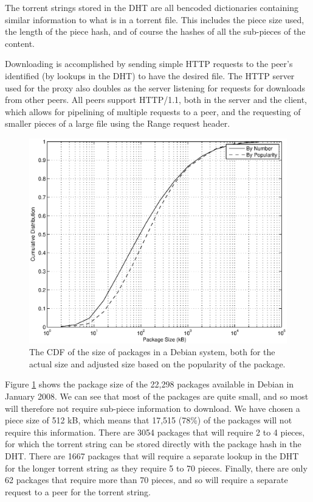 \documentclass[conference]{IEEEtran}
\begin{document}
The torrent strings stored in the DHT are all bencoded dictionaries
containing similar information to what is in a torrent file. This
includes the piece size used, the length of the piece hash, and of
course the hashes of all the sub-pieces of the content.

Downloading is accomplished by sending simple HTTP requests to the
peer's identified (by lookups in the DHT) to have the desired file.
The HTTP server used for the proxy also doubles as the server
listening for requests for downloads from other peers. All peers
support HTTP/1.1, both in the server and the client, which allows
for pipelining of multiple requests to a peer, and the requesting of
smaller pieces of a large file using the Range request header.

\begin{figure}
\centering
\includegraphics[width=\columnwidth]{apt_dht_simulation-size_CDF.eps}
\caption{The CDF of the size of packages in a Debian system, both
for the actual size and adjusted size based on the popularity of
the package.}
\label{size_CDF}
\end{figure}

Figure \ref{size_CDF} shows the package size of the 22,298 packages
available in Debian in January 2008. We can see that most of the
packages are quite small, and so most will therefore not require
sub-piece information to download. We have chosen a piece
size of 512 kB, which means that 17,515 (78\%) of the packages will
not require this information. There are 3054 packages that will
require 2 to 4 pieces, for which the torrent string can be stored
directly with the package hash in the DHT. There are 1667 packages
that will require a separate lookup in the DHT for the longer
torrent string as they require 5 to 70 pieces. Finally, there are
only 62 packages that require more than 70 pieces, and so will
require a separate request to a peer for the torrent string.
\end{document}
